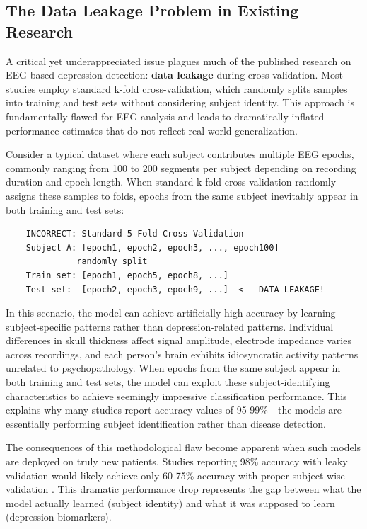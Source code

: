 \subsection{The Data Leakage Problem in Existing Research}

A critical yet underappreciated issue plagues much of the published research on EEG-based depression detection: \textbf{data leakage} during cross-validation. Most studies employ standard k-fold cross-validation, which randomly splits samples into training and test sets without considering subject identity. This approach is fundamentally flawed for EEG analysis and leads to dramatically inflated performance estimates that do not reflect real-world generalization.

Consider a typical dataset where each subject contributes multiple EEG epochs, commonly ranging from 100 to 200 segments per subject depending on recording duration and epoch length. When standard k-fold cross-validation randomly assigns these samples to folds, epochs from the same subject inevitably appear in both training and test sets:

\begin{verbatim}
    INCORRECT: Standard 5-Fold Cross-Validation
    Subject A: [epoch1, epoch2, epoch3, ..., epoch100]
              randomly split
    Train set: [epoch1, epoch5, epoch8, ...]
    Test set:  [epoch2, epoch3, epoch9, ...]  <-- DATA LEAKAGE!
\end{verbatim}

In this scenario, the model can achieve artificially high accuracy by learning subject-specific patterns rather than depression-related patterns. Individual differences in skull thickness affect signal amplitude, electrode impedance varies across recordings, and each person's brain exhibits idiosyncratic activity patterns unrelated to psychopathology. When epochs from the same subject appear in both training and test sets, the model can exploit these subject-identifying characteristics to achieve seemingly impressive classification performance. This explains why many studies report accuracy values of 95-99\%---the models are essentially performing subject identification rather than disease detection.

The consequences of this methodological flaw become apparent when such models are deployed on truly new patients. Studies reporting 98\% accuracy with leaky validation would likely achieve only 60-75\% accuracy with proper subject-wise validation \cite{saeb2017need, varoquaux2017assessing}. This dramatic performance drop represents the gap between what the model actually learned (subject identity) and what it was supposed to learn (depression biomarkers).

